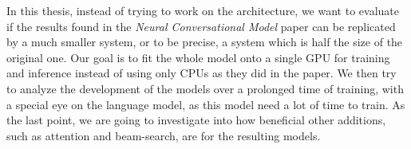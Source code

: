 In this thesis, instead of trying to work on the architecture, we want to evaluate if the results found in the \emph{Neural Conversational Model} paper can be replicated by a much smaller system, or to be precise, a system which is half the size of the original one. Our goal is to fit the whole model onto a single GPU for training and inference instead of using only CPUs as they did in the paper. We then try to analyze the development of the models over a prolonged time of training, with a special eye on the language model, as this model need a lot of time to train. As the last point, we are going to investigate into how beneficial other additions, such as attention and beam-search, are for the resulting models.